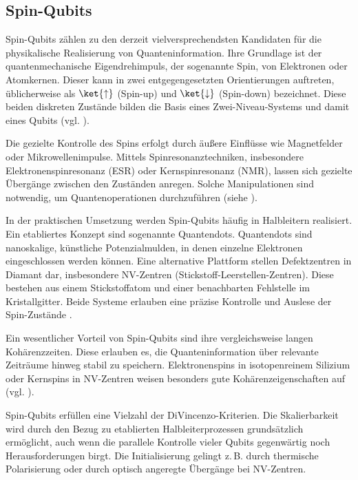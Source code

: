 \subsection{Spin-Qubits}
\label{subsec: Spin-Qubits}
Spin-Qubits zählen zu den derzeit vielversprechendsten Kandidaten für die physikalische Realisierung von Quanteninformation. Ihre Grundlage ist der quantenmechanische Eigendrehimpuls, der sogenannte Spin, von Elektronen oder Atomkernen. Dieser kann in zwei entgegengesetzten Orientierungen auftreten, üblicherweise als $\ket{\uparrow}$ (Spin-up) und $\ket{\downarrow}$ (Spin-down) bezeichnet. Diese beiden diskreten Zustände bilden die Basis eines Zwei-Niveau-Systems und damit eines Qubits (vgl. \cite{burkard_semiconductor_2023}).

Die gezielte Kontrolle des Spins erfolgt durch äußere Einflüsse wie Magnetfelder oder Mikrowellenimpulse. Mittels Spinresonanztechniken, insbesondere Elektronenspinresonanz (ESR) oder Kernspinresonanz (NMR), lassen sich gezielte Übergänge zwischen den Zuständen anregen. Solche Manipulationen sind notwendig, um Quantenoperationen durchzuführen (siehe \cite{petta_coherent_2005}).

In der praktischen Umsetzung werden Spin-Qubits häufig in Halbleitern realisiert. Ein etabliertes Konzept sind sogenannte Quantendots. Quantendots sind nanoskalige, künstliche Potenzialmulden, in denen einzelne Elektronen eingeschlossen werden können. Eine alternative Plattform stellen Defektzentren in Diamant dar, insbesondere NV-Zentren (Stickstoff-Leerstellen-Zentren). Diese bestehen aus einem Stickstoffatom und einer benachbarten Fehlstelle im Kristallgitter. Beide Systeme erlauben eine präzise Kontrolle und Auslese der Spin-Zustände \autocite[Kapitel 7.7]{nielsen_quantum_2010}.


Ein wesentlicher Vorteil von Spin-Qubits sind ihre vergleichsweise langen Kohärenzzeiten. Diese erlauben es, die Quanteninformation über relevante Zeiträume hinweg stabil zu speichern. Elektronenspins in isotopenreinem Silizium oder Kernspins in NV-Zentren weisen besonders gute Kohärenzeigenschaften auf (vgl. \cite{burkard_semiconductor_2023}).

Spin-Qubits erfüllen eine Vielzahl der DiVincenzo-Kriterien. Die Skalierbarkeit wird durch den Bezug zu etablierten Halbleiterprozessen grundsätzlich ermöglicht, auch wenn die parallele Kontrolle vieler Qubits gegenwärtig noch Herausforderungen birgt. Die Initialisierung gelingt z.\,B. durch thermische Polarisierung oder durch optisch angeregte Übergänge bei NV-Zentren. 

